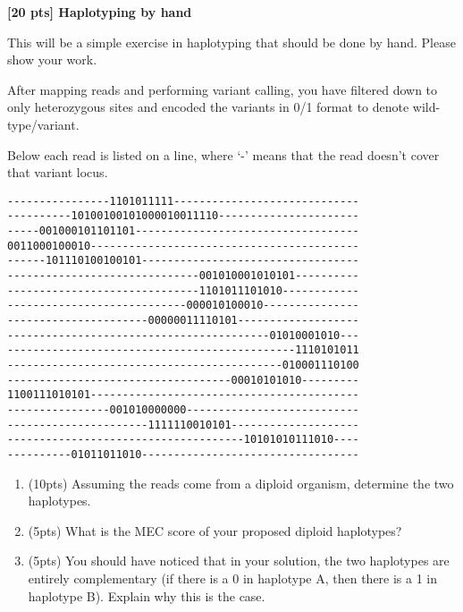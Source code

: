 {\bf [20 pts] Haplotyping by hand}

This will be a simple exercise in haplotyping that should be done by hand. Please show your work.

After mapping reads and performing variant calling, you have filtered down to only heterozygous sites and encoded the variants in 0/1 format to denote wild-type/variant.

Below each read is listed on a line, where `-' means that the read doesn't cover that variant locus.
\begin{verbatim}
----------------1101011111-----------------------------
----------10100100101000010011110----------------------
-----001000101101101-----------------------------------
0011000100010------------------------------------------
------101110100100101----------------------------------
------------------------------001010001010101----------
------------------------------1101011101010------------
----------------------------000010100010---------------
----------------------00000011110101-------------------
-----------------------------------------01010001010---
---------------------------------------------1110101011
-------------------------------------------010001110100
-----------------------------------00010101010---------
1100111010101------------------------------------------
----------------001010000000---------------------------
----------------------1111110010101--------------------
-------------------------------------10101010111010----
----------01011011010----------------------------------
\end{verbatim}

\begin{enumerate}[label=(\alph*)]
    \item (10pts) Assuming the reads come from a diploid organism, determine the two haplotypes.
    \begin{solution}

    \end{solution}
    \item (5pts) What is the MEC score of your proposed diploid haplotypes?
    \begin{solution}

    \end{solution}
    \item (5pts) You should have noticed that in your solution, the two haplotypes are entirely complementary (if there is a 0 in haplotype A, then there is a 1 in haplotype B). Explain why this is the case.
    \begin{solution}

    \end{solution}
\end{enumerate}